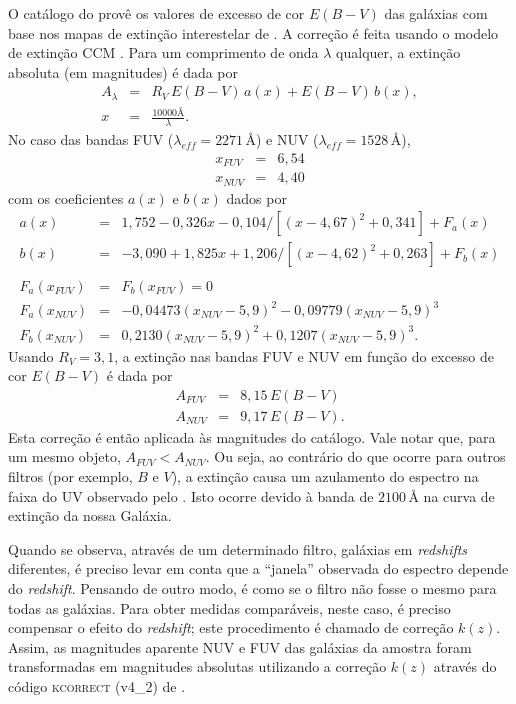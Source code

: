 O catálogo do \galex provê os valores de excesso de cor $E(B-V)$ das galáxias
com base nos mapas de extinção interestelar de \citet{Schlegel1998}. A correção
é feita usando o modelo de extinção CCM \citep*[equações 4a e 4b]{Cardelli1989}.
Para um comprimento de onda $\lambda$ qualquer, a extinção absoluta (em
magnitudes) é dada por
\begin{eqnarray*}
	A_\lambda &=& R_V\,E(B-V)\,a(x) + E(B-V)\,b(x), \\
	x &=& \frac{10000\text{\AA}}{\lambda}.
\end{eqnarray*}
No caso das bandas FUV ($\lambda_{eff}=2271\,\text{\AA}$) e NUV
($\lambda_{eff}=1528\,\text{\AA}$),
\begin{eqnarray*}
	x_{FUV} &=& 6,54\\
	x_{NUV} &=& 4,40
\end{eqnarray*}
com os coeficientes $a(x)$ e $b(x)$ dados por
\begin{eqnarray*}
	a(x) &=& 1,752 - 0,326x - 0,104/[(x-4,67)^2 + 0,341] + F_a(x) \\
	b(x) &=& -3,090 + 1,825x + 1,206/[(x-4,62)^2 + 0,263] + F_b(x) \\
	\\
	F_a(x_{FUV}) &=& F_b(x_{FUV}) = 0 \\
	F_a(x_{NUV}) &=& -0,04473(x_{NUV}-5,9)^2 - 0,09779(x_{NUV}-5,9)^3 \\
	F_b(x_{NUV}) &=& 0,2130(x_{NUV}-5,9)^2 + 0,1207(x_{NUV}-5,9)^3.
\end{eqnarray*}
Usando $R_V=3,1$, a extinção nas bandas FUV e NUV em função do excesso de cor
$E(B-V)$ é dada por
\begin{eqnarray*}
	A_{FUV} &=& 8,15\,E(B-V) \\
	A_{NUV} &=& 9,17\,E(B-V).
\end{eqnarray*}
Esta correção é então aplicada às magnitudes do catálogo. Vale notar que, para
um mesmo objeto, $A_{FUV} < A_{NUV}$. Ou seja, ao contrário do que ocorre para
outros filtros (por exemplo, $B$ e $V$), a extinção causa um azulamento do
espectro na faixa do UV observado pelo \galex. Isto ocorre devido à banda de
$2100\,\text{\AA}$ na curva de extinção da nossa Galáxia.

Quando se observa, através de um determinado filtro, galáxias em {\em redshifts}
diferentes, é preciso levar em conta que a ``janela'' observada do espectro
depende do {\em redshift}. Pensando de outro modo, é como se o filtro não fosse
o mesmo para todas as galáxias. Para obter medidas comparáveis, neste caso, é
preciso compensar o efeito do {\em redshift}; este procedimento é chamado de
correção $k(z)$. Assim, as magnitudes aparente NUV e FUV das galáxias da amostra
foram transformadas em magnitudes absolutas utilizando a correção $k(z)$ através
do código \textsc{kcorrect} (v4\_2) de \citet{Blanton2007}.


